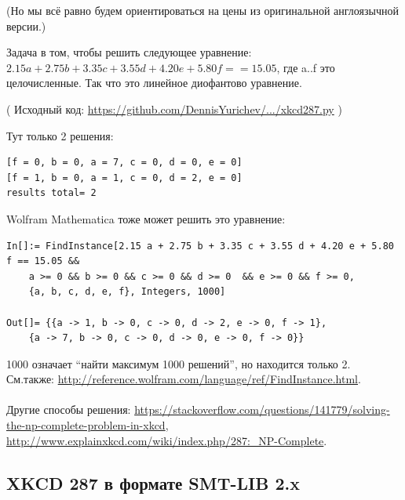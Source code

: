 (Но мы всё равно будем ориентироваться на цены из оригинальной англоязычной версии.)

Задача в том, чтобы решить следующее уравнение:
$2.15a + 2.75b + 3.35c + 3.55d + 4.20e + 5.80f == 15.05$,
где a..f это целочисленные.
Так что это линейное диофантово уравнение.



( Исходный код: \url{https://github.com/DennisYurichev/.../xkcd287.py} )

Тут только 2 решения:

\begin{lstlisting}
[f = 0, b = 0, a = 7, c = 0, d = 0, e = 0]
[f = 1, b = 0, a = 1, c = 0, d = 2, e = 0]
results total= 2
\end{lstlisting}

Wolfram Mathematica тоже может решить это уравнение:

\begin{lstlisting}
In[]:= FindInstance[2.15 a + 2.75 b + 3.35 c + 3.55 d + 4.20 e + 5.80 f == 15.05 && 
	a >= 0 && b >= 0 && c >= 0 && d >= 0  && e >= 0 && f >= 0, 
	{a, b, c, d, e, f}, Integers, 1000]

Out[]= {{a -> 1, b -> 0, c -> 0, d -> 2, e -> 0, f -> 1},
	{a -> 7, b -> 0, c -> 0, d -> 0, e -> 0, f -> 0}}
\end{lstlisting}

1000 означает ``найти максимум 1000 решений'', но находится только 2.
См.также: \url{http://reference.wolfram.com/language/ref/FindInstance.html}.\\
\\
Другие способы решения:
\url{https://stackoverflow.com/questions/141779/solving-the-np-complete-problem-in-xkcd},
\url{http://www.explainxkcd.com/wiki/index.php/287:_NP-Complete}.

\subsection{XKCD 287 в формате SMT-LIB 2.x}



